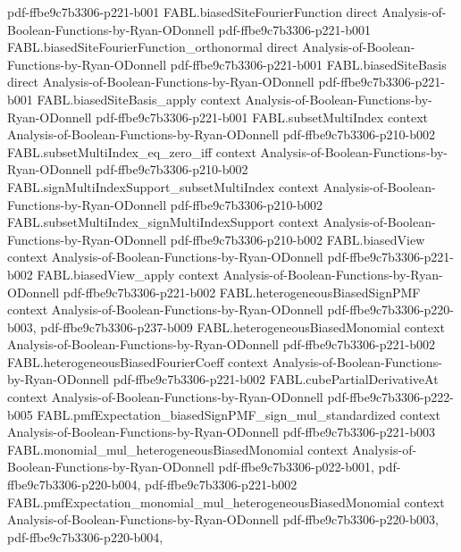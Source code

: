 \begin{theorem}
  {pdf-ffbe9c7b3306-p221-b001}
\proofstep
  {FABL.biasedSiteFourierFunction}
  {direct}
  {Analysis-of-Boolean-Functions-by-Ryan-ODonnell}
  {pdf-ffbe9c7b3306-p221-b001}
\proofstep
  {FABL.biasedSiteFourierFunction_orthonormal}
  {direct}
  {Analysis-of-Boolean-Functions-by-Ryan-ODonnell}
  {pdf-ffbe9c7b3306-p221-b001}
\proofstep
  {FABL.biasedSiteBasis}
  {direct}
  {Analysis-of-Boolean-Functions-by-Ryan-ODonnell}
  {pdf-ffbe9c7b3306-p221-b001}
\proofstep
  {FABL.biasedSiteBasis_apply}
  {context}
  {Analysis-of-Boolean-Functions-by-Ryan-ODonnell}
  {pdf-ffbe9c7b3306-p221-b001}
\proofstep
  {FABL.subsetMultiIndex}
  {context}
  {Analysis-of-Boolean-Functions-by-Ryan-ODonnell}
  {pdf-ffbe9c7b3306-p210-b002}
\proofstep
  {FABL.subsetMultiIndex_eq_zero_iff}
  {context}
  {Analysis-of-Boolean-Functions-by-Ryan-ODonnell}
  {pdf-ffbe9c7b3306-p210-b002}
\proofstep
  {FABL.signMultiIndexSupport_subsetMultiIndex}
  {context}
  {Analysis-of-Boolean-Functions-by-Ryan-ODonnell}
  {pdf-ffbe9c7b3306-p210-b002}
\proofstep
  {FABL.subsetMultiIndex_signMultiIndexSupport}
  {context}
  {Analysis-of-Boolean-Functions-by-Ryan-ODonnell}
  {pdf-ffbe9c7b3306-p210-b002}
\proofstep
  {FABL.biasedView}
  {context}
  {Analysis-of-Boolean-Functions-by-Ryan-ODonnell}
  {pdf-ffbe9c7b3306-p221-b002}
\proofstep
  {FABL.biasedView_apply}
  {context}
  {Analysis-of-Boolean-Functions-by-Ryan-ODonnell}
  {pdf-ffbe9c7b3306-p221-b002}
\proofstep
  {FABL.heterogeneousBiasedSignPMF}
  {context}
  {Analysis-of-Boolean-Functions-by-Ryan-ODonnell}
  {pdf-ffbe9c7b3306-p220-b003,
    pdf-ffbe9c7b3306-p237-b009}
\proofstep
  {FABL.heterogeneousBiasedMonomial}
  {context}
  {Analysis-of-Boolean-Functions-by-Ryan-ODonnell}
  {pdf-ffbe9c7b3306-p221-b002}
\proofstep
  {FABL.heterogeneousBiasedFourierCoeff}
  {context}
  {Analysis-of-Boolean-Functions-by-Ryan-ODonnell}
  {pdf-ffbe9c7b3306-p221-b002}
\proofstep
  {FABL.cubePartialDerivativeAt}
  {context}
  {Analysis-of-Boolean-Functions-by-Ryan-ODonnell}
  {pdf-ffbe9c7b3306-p222-b005}
\proofstep
  {FABL.pmfExpectation_biasedSignPMF_sign_mul_standardized}
  {context}
  {Analysis-of-Boolean-Functions-by-Ryan-ODonnell}
  {pdf-ffbe9c7b3306-p221-b003}
\proofstep
  {FABL.monomial_mul_heterogeneousBiasedMonomial}
  {context}
  {Analysis-of-Boolean-Functions-by-Ryan-ODonnell}
  {pdf-ffbe9c7b3306-p022-b001,
    pdf-ffbe9c7b3306-p220-b004,
    pdf-ffbe9c7b3306-p221-b002}
\proofstep
  {FABL.pmfExpectation_monomial_mul_heterogeneousBiasedMonomial}
  {context}
  {Analysis-of-Boolean-Functions-by-Ryan-ODonnell}
  {pdf-ffbe9c7b3306-p220-b003,
    pdf-ffbe9c7b3306-p220-b004,
}
\end{theorem}
